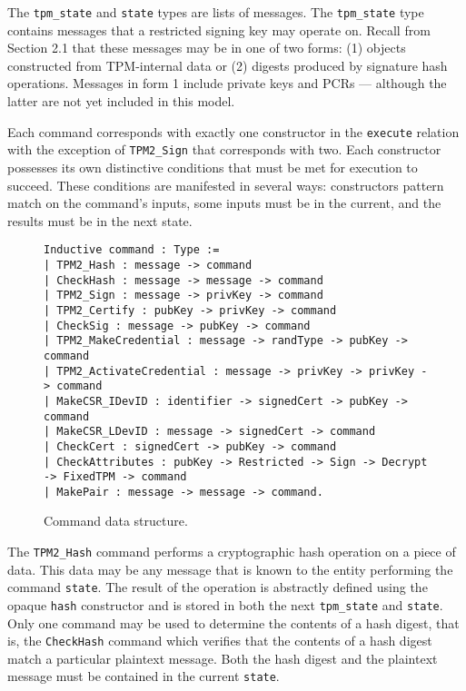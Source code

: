 \documentclass[runningheads]{llncs}
\begin{document}
The \verb|tpm_state| and \verb|state| types are lists of messages. The
\verb|tpm_state| type contains messages that a restricted signing key
may operate on. Recall from Section 2.1 that these messages may be in
one of two forms: (1) objects constructed from TPM-internal data or
(2) digests produced by signature hash operations. Messages in form 1
include private keys and PCRs --- although the latter are not yet
included in this model.

Each command corresponds with exactly one constructor in the
\verb|execute| relation with the exception of \verb|TPM2_Sign| that
corresponds with two. Each constructor possesses its own distinctive
conditions that must be met for execution to succeed. These
conditions are manifested in several ways: constructors pattern match
on the command's inputs, some inputs must be in the current, and
the results must be in the next state. 

\begin{figure}[hbtp]
  \begin{footnotesize}
\begin{lstlisting}[language=Coq]
Inductive command : Type :=
| TPM2_Hash : message -> command
| CheckHash : message -> message -> command
| TPM2_Sign : message -> privKey -> command
| TPM2_Certify : pubKey -> privKey -> command
| CheckSig : message -> pubKey -> command
| TPM2_MakeCredential : message -> randType -> pubKey -> command
| TPM2_ActivateCredential : message -> privKey -> privKey -> command
| MakeCSR_IDevID : identifier -> signedCert -> pubKey -> command
| MakeCSR_LDevID : message -> signedCert -> command
| CheckCert : signedCert -> pubKey -> command
| CheckAttributes : pubKey -> Restricted -> Sign -> Decrypt -> FixedTPM -> command
| MakePair : message -> message -> command.
\end{lstlisting}
\end{footnotesize}
\caption{Command data structure.}
\label{fig:command-model}
\end{figure}

The \verb|TPM2_Hash| command performs a cryptographic hash operation
on a piece of data. This data may be any message that is known to the
entity performing the command \verb|state|. The result of the
operation is abstractly defined using the opaque \verb|hash|
constructor and is stored in both the next \verb|tpm_state| and
\verb|state|. Only one command may be used to determine the contents
of a hash digest, that is, the \verb|CheckHash| command which verifies
that the contents of a hash digest match a particular plaintext
message. Both the hash digest and the plaintext message must be
contained in the current \verb|state|.
\end{document}
